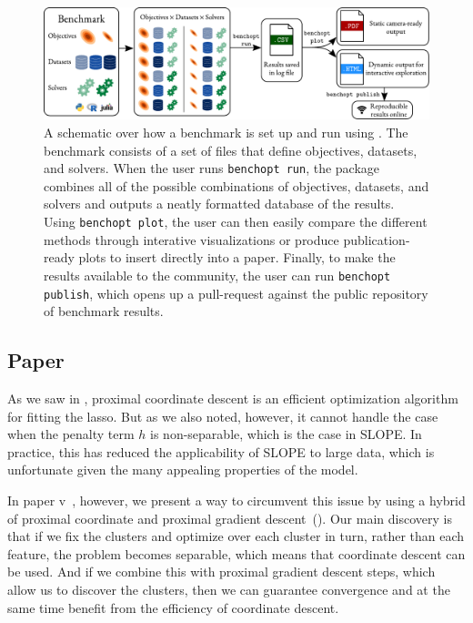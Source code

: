 \begin{figure}[htpb]
  \centering
  \includegraphics[width=\textwidth]{figures/benchopt_schema_objectives_with_logos.pdf}
  \caption{%
    A schematic over how a benchmark is set up and run using . The benchmark consists of a set of files that define objectives, datasets, and solvers. When the user runs \texttt{benchopt run}, the package combines all of the possible combinations of objectives, datasets, and solvers and outputs a neatly formatted database of the results.
    Using \texttt{benchopt plot}, the user can then easily compare the different methods through interative visualizations or produce publication-ready plots to insert directly into a paper.
    Finally, to make the results available to the  community, the user can run \texttt{benchopt publish}, which opens up a pull-request against the public repository of benchmark results.
  }
  \label{fig:paper4-highlight}
\end{figure}

\subsection{Paper \V}

As we saw in , proximal coordinate descent is an efficient optimization algorithm for fitting the lasso. But as we also noted, however, it cannot handle the case when the penalty term \(h\) is non-separable, which is the case in SLOPE. In practice, this has reduced the applicability of SLOPE to large data, which is unfortunate given the many appealing properties of the model.

In paper v~\parencite{larsson2023}, however, we present a way to circumvent this issue by using a hybrid of proximal coordinate and proximal gradient descent~(). Our main discovery is that if we fix the clusters and optimize over each cluster in turn, rather than each feature, the problem becomes separable, which means that coordinate descent can be used. And if we combine this with proximal gradient descent steps, which allow us to discover the clusters, then we can guarantee convergence and at the same time benefit from the efficiency of coordinate descent.

